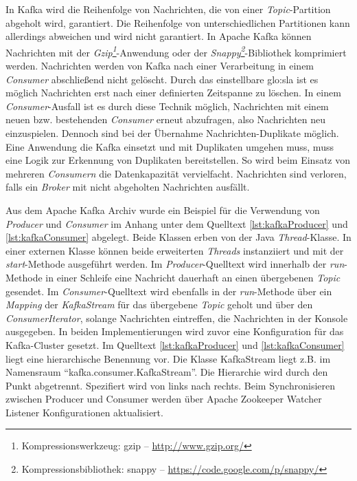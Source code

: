 In Kafka wird die Reihenfolge von Nachrichten, die von einer \textit{Topic}-Partition abgeholt wird, garantiert. Die Reihenfolge von unterschiedlichen Partitionen kann allerdings abweichen und wird nicht garantiert. In Apache Kafka können Nachrichten mit der \textit{Gzip\footnote{Kompressionswerkzeug: gzip -- \url{http://www.gzip.org/}}}-Anwendung oder der \textit{Snappy\footnote{Kompressionsbibliothek: snappy -- \url{https://code.google.com/p/snappy/}}}-Bibliothek komprimiert werden. Nachrichten werden von Kafka nach einer Verarbeitung in einem \textit{Consumer} abschließend nicht gelöscht. Durch das einstellbare \gls{glo:sla} ist es möglich Nachrichten erst nach einer definierten Zeitspanne zu löschen. In einem \textit{Consumer}-Ausfall ist es durch diese Technik möglich, Nachrichten mit einem neuen bzw. bestehenden \textit{Consumer} erneut abzufragen, also Nachrichten neu einzuspielen. Dennoch sind bei der Übernahme Nachrichten-Duplikate möglich. Eine Anwendung die Kafka einsetzt und mit Duplikaten umgehen muss, muss eine Logik zur Erkennung von Duplikaten bereitstellen.
So wird beim Einsatz von mehreren \textit{Consumern} die Datenkapazität vervielfacht. Nachrichten sind verloren, falls ein \textit{Broker} mit nicht abgeholten Nachrichten ausfällt. 

Aus dem Apache Kafka Archiv  wurde ein Beispiel für die Verwendung von \textit{Producer} und \textit{Consumer} im Anhang unter dem Quelltext \ref{lst:kafkaProducer} und \ref{lst:kafkaConsumer} abgelegt. Beide Klassen erben von der Java \textit{Thread}-Klasse. In einer externen Klasse können beide erweiterten \textit{Threads} instanziiert und mit der \textit{start}-Methode ausgeführt werden. Im \textit{Producer}-Quelltext wird innerhalb der \textit{run}-Methode in einer Schleife eine Nachricht dauerhaft an einen übergebenen \textit{Topic} gesendet. Im \textit{Consumer}-Quelltext wird ebenfalls in der \textit{run}-Methode über ein \textit{Mapping} der \textit{KafkaStream} für das übergebene \textit{Topic} geholt und über den \textit{ConsumerIterator}, solange Nachrichten eintreffen, die Nachrichten in der Konsole ausgegeben. In beiden Implementierungen wird zuvor eine Konfiguration für das Kafka-Cluster gesetzt. Im Quelltext \ref{lst:kafkaProducer} und \ref{lst:kafkaConsumer} liegt eine hierarchische Benennung vor. Die Klasse KafkaStream liegt z.B. im Namensraum "`kafka.consumer.KafkaStream"'. Die Hierarchie wird durch den Punkt abgetrennt. Spezifiert wird von links nach rechts. Beim Synchronisieren zwischen Producer und Consumer werden über Apache Zookeeper Watcher Listener Konfigurationen aktualisiert.

